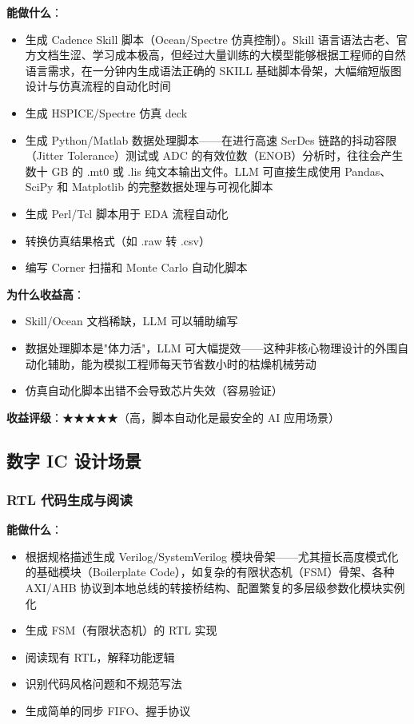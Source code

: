 \documentclass[UTF8,a4paper,10pt,oneside]{ctexart}
\begin{document}
\textbf{能做什么}：
\begin{itemize}
    \item 生成 Cadence Skill 脚本（Ocean/Spectre 仿真控制）。Skill 语言语法古老、官方文档生涩、学习成本极高，但经过大量训练的大模型能够根据工程师的自然语言需求，在一分钟内生成语法正确的 SKILL 基础脚本骨架，大幅缩短版图设计与仿真流程的自动化时间
    \item 生成 HSPICE/Spectre 仿真 deck
    \item 生成 Python/Matlab 数据处理脚本——在进行高速 SerDes 链路的抖动容限（Jitter Tolerance）测试或 ADC 的有效位数（ENOB）分析时，往往会产生数十 GB 的 .mt0 或 .lis 纯文本输出文件。LLM 可直接生成使用 Pandas、SciPy 和 Matplotlib 的完整数据处理与可视化脚本
    \item 生成 Perl/Tcl 脚本用于 EDA 流程自动化
    \item 转换仿真结果格式（如 .raw 转 .csv）
    \item 编写 Corner 扫描和 Monte Carlo 自动化脚本
\end{itemize}

\textbf{为什么收益高}：
\begin{itemize}
    \item Skill/Ocean 文档稀缺，LLM 可以辅助编写
    \item 数据处理脚本是"体力活"，LLM 可大幅提效——这种非核心物理设计的外围自动化辅助，能为模拟工程师每天节省数小时的枯燥机械劳动
    \item 仿真自动化脚本出错不会导致芯片失效（容易验证）
\end{itemize}

\textbf{收益评级}：★★★★★（高，脚本自动化是最安全的 AI 应用场景）

\subsection{数字 IC 设计场景}

\subsubsection{RTL 代码生成与阅读}

\textbf{能做什么}：
\begin{itemize}
    \item 根据规格描述生成 Verilog/SystemVerilog 模块骨架——尤其擅长高度模式化的基础模块（Boilerplate Code），如复杂的有限状态机（FSM）骨架、各种 AXI/AHB 协议到本地总线的转接桥结构、配置繁复的多层级参数化模块实例化
    \item 生成 FSM（有限状态机）的 RTL 实现
    \item 阅读现有 RTL，解释功能逻辑
    \item 识别代码风格问题和不规范写法
    \item 生成简单的同步 FIFO、握手协议
\end{itemize}
\end{document}
